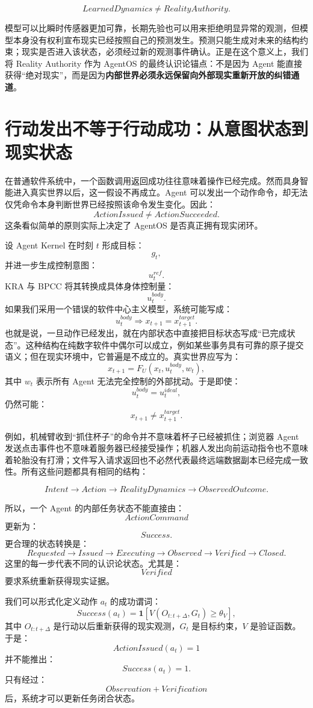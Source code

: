 \[
\boxed{
LearnedDynamics\neq RealityAuthority.
}
\]

模型可以比瞬时传感器更加可靠，长期先验也可以用来拒绝明显异常的观测，但模型本身没有权利宣布现实已经按照自己的预测发生。预测只能生成对未来的结构约束；现实是否进入该状态，必须经过新的观测事件确认。正是在这个意义上，我们将 Reality Authority 作为 AgentOS 的最终认识论锚点：不是因为 Agent 能直接获得``绝对现实''，而是因为\textbf{内部世界必须永远保留向外部现实重新开放的纠错通道}。

\section{行动发出不等于行动成功：从意图状态到现实状态}

在普通软件系统中，一个函数调用返回成功往往意味着操作已经完成。然而具身智能进入真实世界以后，这一假设不再成立。Agent 可以发出一个动作命令，却无法仅凭命令本身判断世界已经按照该命令发生变化。因此：
\[
\boxed{
ActionIssued
\neq
ActionSucceeded.
}
\]
这条看似简单的原则实际上决定了 AgentOS 是否真正拥有现实闭环。

设 Agent Kernel 在时刻 $t$ 形成目标：
\[
g_t,
\]
并进一步生成控制意图：
\[
u_t^{ref}.
\]
KRA 与 BPCC 将其转换成具体身体控制量：
\[
u_t^{body}.
\]
如果我们采用一个错误的软件中心主义模型，系统可能写成：
\[
u_t^{body}
\Rightarrow
x_{t+1}=x^{target}_{t+1}.
\]
也就是说，一旦动作已经发出，就在内部状态中直接把目标状态写成``已完成状态''。这种结构在纯数字软件中偶尔可以成立，例如某些事务具有可靠的原子提交语义；但在现实环境中，它普遍是不成立的。真实世界应写为：
\[
x_{t+1}
=
F_U
\left(
x_t,
u_t^{body},
w_t
\right),
\]
其中 $w_t$ 表示所有 Agent 无法完全控制的外部扰动。于是即使：
\[
u_t^{body}=u_t^{ideal},
\]
仍然可能：
\[
x_{t+1}\neq x^{target}_{t+1}.
\]

例如，机械臂收到``抓住杯子''的命令并不意味着杯子已经被抓住；浏览器 Agent 发送点击事件也不意味着服务器已经接受操作；机器人发出向前运动指令也不意味着轮胎没有打滑；文件写入请求返回也不必然代表最终远端数据副本已经完成一致性。所有这些问题都具有相同的结构：

\[
Intent
\rightarrow
Action
\rightarrow
RealityDynamics
\rightarrow
ObservedOutcome.
\]

所以，一个 Agent 的内部任务状态不能直接由：
\[
ActionCommand
\]
更新为：
\[
Success.
\]
更合理的状态转换是：
\[
Requested
\rightarrow
Issued
\rightarrow
Executing
\rightarrow
Observed
\rightarrow
Verified
\rightarrow
Closed.
\]
这里的每一步代表不同的认识论状态。尤其是：
\[
Verified
\]
要求系统重新获得现实证据。

我们可以形式化定义动作 $a_t$ 的成功谓词：
\[
Success(a_t)
=
\mathbf 1
\left[
V
\left(
O_{t:t+\Delta},
G_t
\right)
\geq\theta_V
\right],
\]
其中 $O_{t:t+\Delta}$ 是行动以后重新获得的现实观测，$G_t$ 是目标约束，$V$ 是验证函数。于是：
\[
ActionIssued(a_t)=1
\]
并不能推出：
\[
Success(a_t)=1.
\]
只有经过：
\[
Observation+Verification
\]
后，系统才可以更新任务闭合状态。

